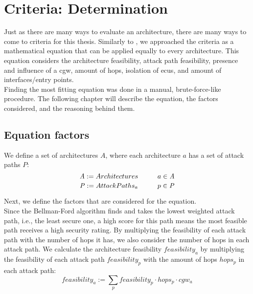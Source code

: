 \chapter{Criteria: Determination}
\label{chp:criteria}

Just as there are many ways to evaluate an architecture, there are many ways to come to criteria for this thesis.
Similarly to \cite{threat_surf}, we approached the criteria as a mathematical equation that can be applied equally to every architecture.
This equation considers the architecture feasibility, attack path feasibility, presence and influence of a \acrshort{cgw},
amount of hops, isolation of \acrshort{ecu}s, and amount of interfaces/entry points.\\

Finding the most fitting equation was done in a manual, brute-force-like procedure.
The following chapter will describe the equation, the factors considered, and the reasoning behind them.\\

\section{Equation factors}
\label{sec:equation_factors}

We define a set of architectures $\mathit{A}$, where each architecture $a$ has a set of attack paths $\mathit{P}$:\\
\begin{equation}
    \mathit{A} := {Architectures} \hspace*{1cm} a \in \mathit{A} \label{eq:architectures}
\end{equation}
\begin{equation}
    \mathit{P} := {Attack Paths_{a}} \hspace*{1cm} p \in \mathit{P} \label{eq:attack_paths}
\end{equation}

\hfill \break

Next, we define the factors that are considered for the equation.\\

Since the Bellman-Ford algorithm finds and takes the lowest weighted attack path, i.e., the least secure one, 
a high score for this path means the most feasible path receives a high security rating.
By multiplying the feasibility of each attack path with the number of hops it has, we also consider the number of hops in each attack path.
We calculate the architecture feasibility $feasibility_{a}$ by multiplying the feasibility of each attack path $feasibility_{p}$ with the amount of hops $hops_{p}$ in each attack path:
\begin{equation}
    feasibility_{a} := \sum_{p} feasibility_{p} \cdot  hops_{p} \cdot  cgw_{a} \label{eq:feasibility}
\end{equation}


